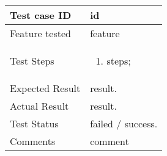 
\begin{table}[H]
	\begin{center}
		\begin{tabular}{ | p{} | p{} | }
		\hline
		Test case ID & id\\
		\hline
		Feature tested & feature\\
		\hline
		Test Steps & 
			\begin{enumerate}
				\item steps;
			\end{enumerate} \\
		\hline
		Expected Result & result.\\
		\hline
		Actual Result & result.\\ 
		\hline
		Test Status & failed / success.\\ 
		\hline
		Comments & comment\\ 
		\hline
		
		\end{tabular}
	\end{center}
\end{table}